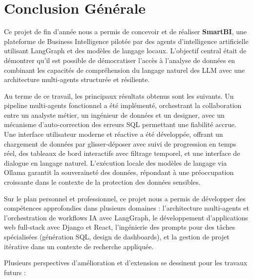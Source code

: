 \chapter*{Conclusion Générale}

Ce projet de fin d'année nous a permis de concevoir et de réaliser \textbf{SmartBI}, une plateforme de Business Intelligence pilotée par des agents d'intelligence artificielle utilisant LangGraph et des modèles de langage locaux. L'objectif central était de démontrer qu'il est possible de démocratiser l'accès à l'analyse de données en combinant les capacités de compréhension du langage naturel des LLM avec une architecture multi-agents structurée et résiliente.

Au terme de ce travail, les principaux résultats obtenus sont les suivants. Un pipeline multi-agents fonctionnel a été implémenté, orchestrant la collaboration entre un analyste métier, un ingénieur de données et un designer, avec un mécanisme d'auto-correction des erreurs SQL permettant une fiabilité accrue. Une interface utilisateur moderne et réactive a été développée, offrant un chargement de données par glisser-déposer avec suivi de progression en temps réel, des tableaux de bord interactifs avec filtrage temporel, et une interface de dialogue en langage naturel. L'exécution locale des modèles de langage via Ollama garantit la souveraineté des données, répondant à une préoccupation croissante dans le contexte de la protection des données sensibles.

Sur le plan personnel et professionnel, ce projet nous a permis de développer des compétences approfondies dans plusieurs domaines : l'architecture multi-agents et l'orchestration de workflows IA avec LangGraph, le développement d'applications web full-stack avec Django et React, l'ingénierie des prompts pour des tâches spécialisées (génération SQL, design de dashboards), et la gestion de projet itérative dans un contexte de recherche appliquée.

Plusieurs perspectives d'amélioration et d'extension se dessinent pour les travaux futurs :

